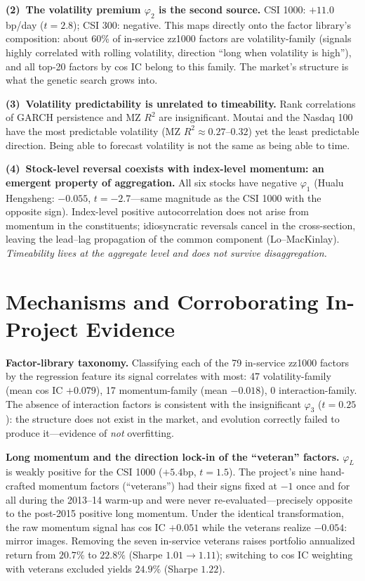\documentclass[11pt,a4paper]{article}
\begin{document}
\textbf{(2)~The volatility premium $\varphi_2$ is the second source.} CSI 1000: $+11.0$bp/day ($t=2.8$); CSI 300: negative. This maps directly onto the factor library's composition: about 60\% of in-service zz1000 factors are volatility-family (signals highly correlated with rolling volatility, direction ``long when volatility is high''), and all top-20 factors by cos IC belong to this family. The market's structure is what the genetic search grows into.

\textbf{(3)~Volatility predictability is unrelated to timeability.} Rank correlations of GARCH persistence and MZ $R^2$ are insignificant. Moutai and the Nasdaq 100 have the most predictable volatility (MZ $R^2\approx0.27$--$0.32$) yet the least predictable direction. Being able to forecast volatility is not the same as being able to time.

\textbf{(4)~Stock-level reversal coexists with index-level momentum: an emergent property of aggregation.} All six stocks have negative $\varphi_1$ (Hualu Hengsheng: $-0.055$, $t=-2.7$---same magnitude as the CSI 1000 with the opposite sign). Index-level positive autocorrelation does not arise from momentum in the constituents; idiosyncratic reversals cancel in the cross-section, leaving the lead--lag propagation of the common component (Lo--MacKinlay). \emph{Timeability lives at the aggregate level and does not survive disaggregation.}

\section{Mechanisms and Corroborating In-Project Evidence}
\textbf{Factor-library taxonomy.} Classifying each of the 79 in-service zz1000 factors by the regression feature its signal correlates with most: 47 volatility-family (mean cos IC $+0.079$), 17 momentum-family (mean $-0.018$), 0 interaction-family. The absence of interaction factors is consistent with the insignificant $\varphi_3$ ($t=0.25$): the structure does not exist in the market, and evolution correctly failed to produce it---evidence of \emph{not} overfitting.

\textbf{Long momentum and the direction lock-in of the ``veteran'' factors.} $\varphi_L$ is weakly positive for the CSI 1000 ($+5.4$bp, $t=1.5$). The project's nine hand-crafted momentum factors (``veterans'') had their signs fixed at $-1$ once and for all during the 2013--14 warm-up and were never re-evaluated---precisely opposite to the post-2015 positive long momentum. Under the identical transformation, the raw momentum signal has cos IC $+0.051$ while the veterans realize $-0.054$: mirror images. Removing the seven in-service veterans raises portfolio annualized return from $20.7\%$ to $22.8\%$ (Sharpe $1.01\to1.11$); switching to cos IC weighting with veterans excluded yields $24.9\%$ (Sharpe $1.22$).
\end{document}
